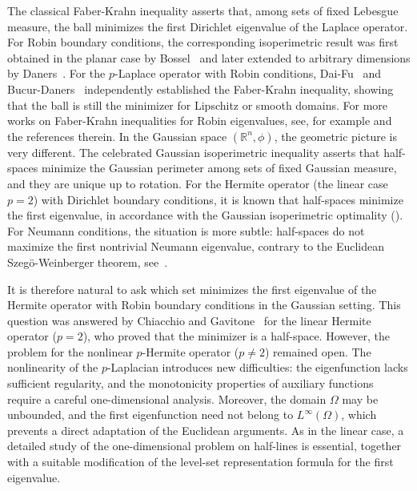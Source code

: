 \documentclass[11pt,leqno]{amsart}
\numberwithin{equation}{section}
\begin{document}
The classical Faber-Krahn inequality asserts that, among sets of fixed Lebesgue measure, the ball minimizes the first Dirichlet eigenvalue of the Laplace operator. For Robin boundary conditions,  the corresponding isoperimetric result was first obtained in the planar case by Bossel~\cite{BosselCR} and later extended to arbitrary dimensions by Daners~\cite{DanersMathann}. For the $p$-Laplace operator with Robin conditions, Dai-Fu~\cite{Daiqiuyi} and Bucur-Daners~\cite{BucurCV} independently established the Faber-Krahn inequality, showing that the ball is still the minimizer for Lipschitz or smooth domains. For more works on Faber-Krahn inequalities for Robin eigenvalues, see, for example \cite{BFK17, BG15, ChendaguangJDE,  CLW26, CWZ26} and the references therein.
In the Gaussian space $(\mathbb{R}^n,\phi)$, the geometric picture is very different. The celebrated Gaussian isoperimetric inequality asserts that half-spaces minimize the Gaussian perimeter among sets of fixed Gaussian measure, and they are unique up to rotation. For the Hermite operator (the linear case $p=2$) with Dirichlet boundary conditions, it is known that half-spaces minimize the first eigenvalue, in accordance with the Gaussian isoperimetric optimality (\cite{BettaZAMP,Ehrhard84,Sudakov}). For Neumann conditions, the situation is more subtle: half-spaces do not maximize the first nontrivial Neumann eigenvalue, contrary to the Euclidean Szeg\"{o}-Weinberger theorem, see~\cite{ChiacchioNeumann}.

It is therefore natural to ask which set minimizes the first eigenvalue of the Hermite operator with Robin boundary conditions in the Gaussian setting. This question was answered by Chiacchio and Gavitone~\cite{ChiacchioMathann} for the linear Hermite operator ($p=2$), who proved that the minimizer is a half-space. However, the problem for the nonlinear $p$-Hermite operator ($p\neq 2$) remained open. The nonlinearity of the $p$-Laplacian introduces new difficulties: the eigenfunction lacks sufficient regularity,  and the monotonicity properties of auxiliary functions require a careful one-dimensional analysis. Moreover, the domain $\Omega$ may be unbounded, and the first eigenfunction need not belong to $L^\infty(\Omega)$, which prevents a direct adaptation of the Euclidean  arguments. As in the linear case, a detailed study of the one-dimensional problem on half-lines is essential, together with a suitable modification of the level-set representation formula for the first eigenvalue.
\end{document}
